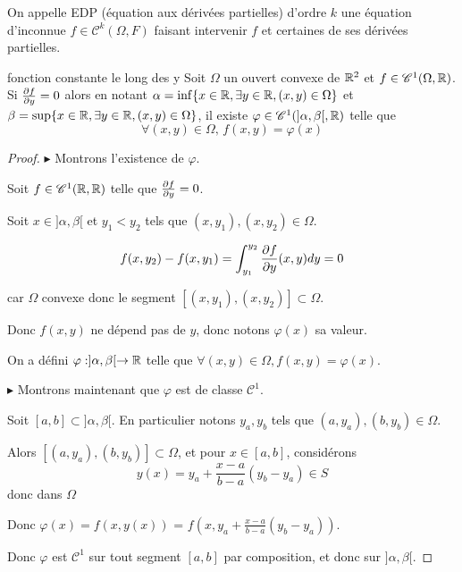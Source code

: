 On appelle EDP (équation aux dérivées partielles) d'ordre $k$ une équation d'inconnue $f \in \mathscr C^k(\Omega, F)$
faisant intervenir $f$ et certaines de ses dérivées partielles. 

\begin{theoreme}{fonction constante le long des y}{}
    Soit $\Omega$ un ouvert convexe de $\mathbb{R}^2$ et $f \in \mathscr C^1(\Omega, \mathbb{R})$.
    Si $\frac{\partial f}{\partial y} = 0$ alors en notant $\alpha = \inf \{x \in \mathbb{R}, \exists y \in \mathbb{R}, (x, y) \in \Omega\}$
    et $\beta = \sup \{x \in \mathbb{R}, \exists y \in \mathbb{R}, (x, y) \in \Omega\}$, il existe
    $\varphi \in \mathscr C^1(]\alpha, \beta[, \mathbb{R})$ telle que
    $$\forall (x, y) \in \Omega, \, f(x, y) = \varphi(x)$$
\end{theoreme}


\begin{proof}
    $\blacktriangleright$ Montrons l'existence de $\varphi$.
    
    Soit $f \in \mathscr C^1(\mathbb{R}, \mathbb{R})$ telle que $\frac{\partial f}{\partial y} = 0$.

    Soit $x \in ] \alpha, \beta [$ et $y_1 < y_2$ tels que $(x, y_1), (x, y_2) \in \Omega$.

    $$ f(x, y_2) - f(x, y_1) = \int_{y_1}^{y_2} \frac{\partial f}{\partial y} (x, y) dy = 0$$
    
    car $\Omega$ convexe donc le segment $[(x, y_1), (x, y_2)] \subset \Omega$.

    Donc $f(x, y)$ ne dépend pas de $y$, donc notons $\varphi(x)$ sa valeur. 

    On a défini $\varphi : ]\alpha, \beta[ \to \mathbb{R}$ telle que 
    $\forall (x, y) \in \Omega, f(x, y) = \varphi(x)$.

    \lvspace 


    \lvspace \avspace

    $\blacktriangleright$ Montrons maintenant que $\varphi$ est de classe $\mathscr C^1$.

    Soit $[a, b] \subset ]\alpha, \beta[$. En particulier notons 
    $y_a, y_b$ tels que $(a, y_a), (b, y_b) \in \Omega$.

    Alors $[(a, y_a), (b, y_b)] \subset \Omega$, et pour $x \in [a, b]$, considérons 
    $$y(x) = y_a + \frac{x - a }{ b - a } (y_b - y_a) \in S$$ donc dans $\Omega$

    Donc $\varphi(x) = f(x, y(x))$ = $f\left(x, y_a + \frac{x - a }{ b - a } (y_b - y_a) \right)$.

    Donc $\varphi$ est $ \mathscr C^1$ sur tout segment $[a, b]$ par composition, et donc sur $]\alpha, \beta[$.
\end{proof}

